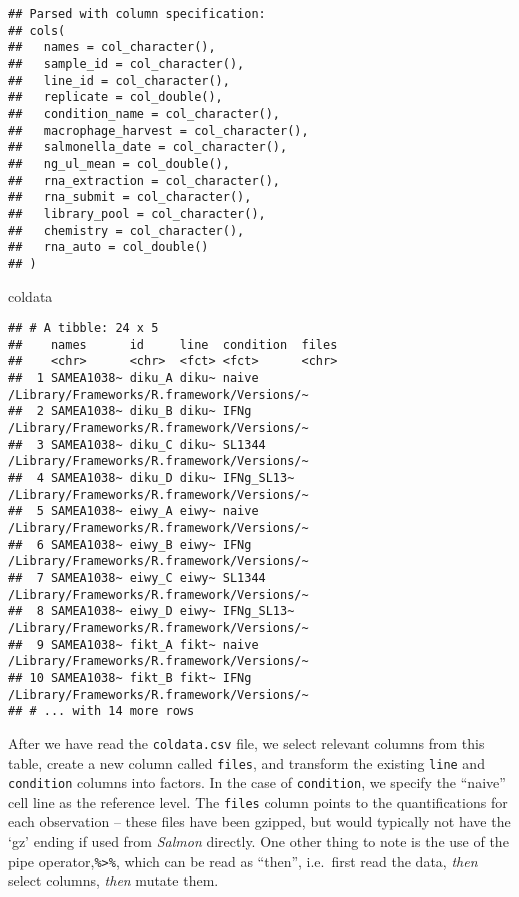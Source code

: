 \documentclass[
]{article}
\newenvironment{Shaded}{}{}
\newcommand{\NormalTok}[1]{#1}
\begin{document}
\begin{verbatim}
## Parsed with column specification:
## cols(
##   names = col_character(),
##   sample_id = col_character(),
##   line_id = col_character(),
##   replicate = col_double(),
##   condition_name = col_character(),
##   macrophage_harvest = col_character(),
##   salmonella_date = col_character(),
##   ng_ul_mean = col_double(),
##   rna_extraction = col_character(),
##   rna_submit = col_character(),
##   library_pool = col_character(),
##   chemistry = col_character(),
##   rna_auto = col_double()
## )
\end{verbatim}

\begin{Shaded}
\begin{Highlighting}[]
\NormalTok{coldata}
\end{Highlighting}
\end{Shaded}

\begin{verbatim}
## # A tibble: 24 x 5
##    names      id     line  condition  files                                     
##    <chr>      <chr>  <fct> <fct>      <chr>                                     
##  1 SAMEA1038~ diku_A diku~ naive      /Library/Frameworks/R.framework/Versions/~
##  2 SAMEA1038~ diku_B diku~ IFNg       /Library/Frameworks/R.framework/Versions/~
##  3 SAMEA1038~ diku_C diku~ SL1344     /Library/Frameworks/R.framework/Versions/~
##  4 SAMEA1038~ diku_D diku~ IFNg_SL13~ /Library/Frameworks/R.framework/Versions/~
##  5 SAMEA1038~ eiwy_A eiwy~ naive      /Library/Frameworks/R.framework/Versions/~
##  6 SAMEA1038~ eiwy_B eiwy~ IFNg       /Library/Frameworks/R.framework/Versions/~
##  7 SAMEA1038~ eiwy_C eiwy~ SL1344     /Library/Frameworks/R.framework/Versions/~
##  8 SAMEA1038~ eiwy_D eiwy~ IFNg_SL13~ /Library/Frameworks/R.framework/Versions/~
##  9 SAMEA1038~ fikt_A fikt~ naive      /Library/Frameworks/R.framework/Versions/~
## 10 SAMEA1038~ fikt_B fikt~ IFNg       /Library/Frameworks/R.framework/Versions/~
## # ... with 14 more rows
\end{verbatim}

After we have read the \texttt{coldata.csv} file, we select relevant columns from this
table, create a new column called \texttt{files}, and transform the existing \texttt{line}
and \texttt{condition} columns into factors. In the case of \texttt{condition}, we specify
the ``naive'' cell line as the reference level. The \texttt{files} column points to the
quantifications for each observation -- these files have been gzipped, but
would typically not have the `gz' ending if used from \emph{Salmon} directly. One
other thing to note is the use of the pipe operator,\texttt{\%\textgreater{}\%}, which can be read as
``then'', i.e.~first read the data, \emph{then} select columns, \emph{then} mutate them.
\end{document}
